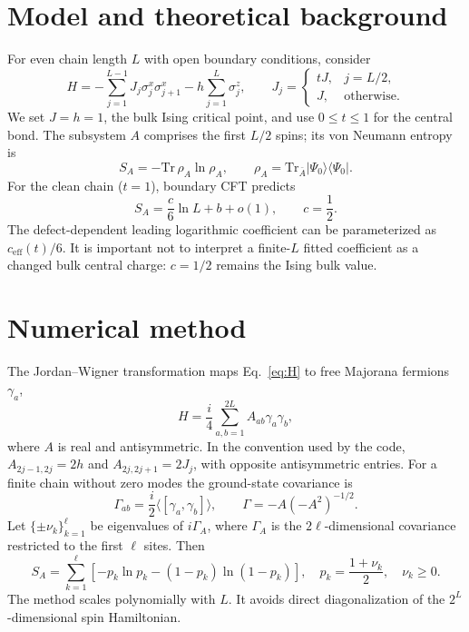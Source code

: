 \documentclass[11pt,a4paper]{article}
\begin{document}
\section{Model and theoretical background}
For even chain length $L$ with open boundary conditions, consider
\begin{equation}
 H=-\sum_{j=1}^{L-1}J_j\sigma_j^x\sigma_{j+1}^x
 -h\sum_{j=1}^L\sigma_j^z,\qquad
 J_j=\begin{cases}tJ,&j=L/2,\\ J,&\text{otherwise}.\end{cases}
 \label{eq:H}
\end{equation}
We set $J=h=1$, the bulk Ising critical point, and use
$0\leq t\leq1$ for the central bond. The subsystem $A$ comprises
the first $L/2$ spins; its von Neumann entropy is
\begin{equation}
S_A=-\mathrm{Tr}\,\rho_A\ln\rho_A,\qquad
\rho_A=\mathrm{Tr}_{\bar A}|\Psi_0\rangle\langle\Psi_0|.
\end{equation}
For the clean chain ($t=1$), boundary CFT predicts
\begin{equation}
S_A=\frac{c}{6}\ln L+b+o(1),\qquad c=\frac12.
\label{eq:CFT}
\end{equation}
The defect-dependent leading logarithmic coefficient can be
parameterized as $c_{\mathrm{eff}}(t)/6$. It is important not to
interpret a finite-$L$ fitted coefficient as a changed bulk central
charge: $c=1/2$ remains the Ising bulk value.

\section{Numerical method}
The Jordan--Wigner transformation maps Eq.~\eqref{eq:H} to free
Majorana fermions $\gamma_a$,
\begin{equation}
H=\frac{i}{4}\sum_{a,b=1}^{2L}A_{ab}\gamma_a\gamma_b,
\end{equation}
where $A$ is real and antisymmetric. In the convention used by the
code, $A_{2j-1,2j}=2h$ and
$A_{2j,2j+1}=2J_j$, with opposite antisymmetric entries.
For a finite chain without zero modes the ground-state covariance is
\begin{equation}
\Gamma_{ab}=\frac{i}{2}\langle[\gamma_a,\gamma_b]\rangle,
\qquad \Gamma=-A(-A^2)^{-1/2}.
\end{equation}
Let $\{\pm\nu_k\}_{k=1}^{\ell}$ be eigenvalues of
$i\Gamma_A$, where $\Gamma_A$ is the $2\ell$-dimensional
covariance restricted to the first $\ell$ sites. Then
\begin{equation}
S_A=\sum_{k=1}^\ell
\left[-p_k\ln p_k-(1-p_k)\ln(1-p_k)\right],
\quad p_k=\frac{1+\nu_k}{2},\quad \nu_k\geq0.
\end{equation}
The method scales polynomially with $L$. It avoids direct
diagonalization of the $2^L$-dimensional spin Hamiltonian.
\end{document}
